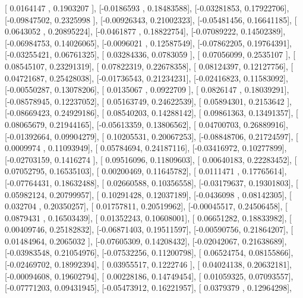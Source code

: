 \documentclass{article}
\begin{document}
       [ 0.0164147 ,  0.1903207 ],
       [-0.0186593 ,  0.18483588],
       [-0.03281853,  0.17922706],
       [-0.09847502,  0.2325998 ],
       [-0.00926343,  0.21002323],
       [-0.05481456,  0.16641185],
       [ 0.0643052 ,  0.20895224],
       [-0.0461877 ,  0.18822754],
       [-0.07089222,  0.14502389],
       [-0.06984753,  0.14026065],
       [-0.0096021 ,  0.12587549],
       [-0.07862205,  0.19764391],
       [-0.03255421,  0.06761325],
       [ 0.03284336,  0.0783059 ],
       [ 0.07056099,  0.2535107 ],
       [ 0.08545107,  0.23291319],
       [ 0.07822319,  0.22678358],
       [ 0.08124397,  0.12127756],
       [ 0.04721687,  0.25428038],
       [-0.01736543,  0.21234231],
       [-0.02416823,  0.11583092],
       [-0.00550287,  0.13078206],
       [ 0.0135067 ,  0.0922709 ],
       [ 0.0826147 ,  0.18039291],
       [-0.08578945,  0.12237052],
       [ 0.05163749,  0.24622539],
       [ 0.05894301,  0.2153642 ],
       [-0.08669423,  0.24929186],
       [ 0.08540203,  0.14288142],
       [ 0.09861363,  0.13491357],
       [ 0.08065679,  0.21944165],
       [-0.05613359,  0.13806562],
       [ 0.04700703,  0.26889916],
       [-0.01392664,  0.09904279],
       [ 0.10205531,  0.20067253],
       [-0.08848706,  0.21724597],
       [ 0.0009974 ,  0.11093949],
       [ 0.05784694,  0.24187116],
       [-0.03416972,  0.10277899],
       [-0.02703159,  0.1416274 ],
       [ 0.09516096,  0.11809603],
       [ 0.00640183,  0.22283452],
       [ 0.07052795,  0.16535103],
       [ 0.00200469,  0.11645782],
       [ 0.0111471 ,  0.17765614],
       [-0.07764431,  0.18632488],
       [ 0.02660588,  0.10356558],
       [-0.03179637,  0.19301803],
       [ 0.05982124,  0.20799957],
       [ 0.10291428,  0.12037189],
       [-0.0436098 ,  0.08142305],
       [ 0.032704  ,  0.20350257],
       [ 0.01757811,  0.20519962],
       [-0.00045517,  0.24506458],
       [ 0.0879431 ,  0.16503439],
       [ 0.01352243,  0.10608001],
       [ 0.06651282,  0.18833982],
       [ 0.00409746,  0.25182832],
       [-0.06871403,  0.19511597],
       [-0.00590756,  0.21864207],
       [ 0.01484964,  0.2065032 ],
       [-0.07605309,  0.14208432],
       [-0.02042067,  0.21638689],
       [-0.03983548,  0.21054976],
       [-0.07532256,  0.11200798],
       [ 0.06524754,  0.08155866],
       [-0.02469702,  0.18992394],
       [ 0.03955517,  0.1222746 ],
       [ 0.04024138,  0.20632181],
       [-0.00094608,  0.19602794],
       [ 0.00228186,  0.14749454],
       [ 0.01059325,  0.07093557],
       [-0.07771203,  0.09431945],
       [-0.05473912,  0.16221957],
       [ 0.0379379 ,  0.12964298],
\end{document}
